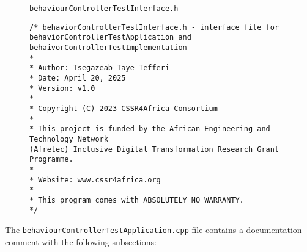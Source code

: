 \documentclass{CSSRforAfrica}
\newcommand{\blank}{~\\}
\newcommand{\checkboxChecked}{\fbox{\ding{51}}} %
\begin{document}
\begin{description}
\item[\checkboxChecked] {\small \verb+behaviourControllerTestInterface.h+}   
{\small \begin{verbatim}
/* behaviorControllerTestInterface.h - interface file for 
behaviorControllerTestApplication and behaivorControllerTestImplementation
*
* Author: Tsegazeab Taye Tefferi
* Date: April 20, 2025
* Version: v1.0
*
* Copyright (C) 2023 CSSR4Africa Consortium
*
* This project is funded by the African Engineering and Technology Network 
(Afretec) Inclusive Digital Transformation Research Grant Programme.
*
* Website: www.cssr4africa.org
*
* This program comes with ABSOLUTELY NO WARRANTY.
*/
\end{verbatim} }



\end{description} 
%

\noindent The {\small \verb+behaviourControllerTestApplication.cpp+} file contains a documentation comment with the following subsections:
\end{document}
